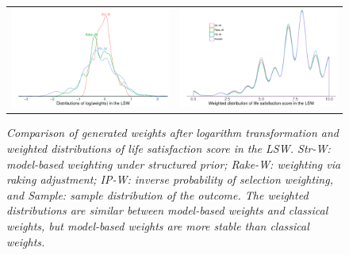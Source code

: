 \documentclass[11pt]{article}
\numberwithin{figure}{section}
\numberwithin{table}{section}
\numberwithin{equation}{section}
\begin{document}
 \begin{figure} \centering \begin{tabular}{cc}
 \includegraphics[width=.475\textwidth]{plot/weight-lsw.pdf}&\includegraphics[width=.475\textwidth]{plot/weighted-lsw-density.pdf}
 \end{tabular} \caption{\em Comparison of generated weights after logarithm
 transformation and weighted distributions of life satisfaction score in the
 LSW. Str-W: model-based weighting under structured prior; Rake-W: weighting
 via raking adjustment; IP-W: inverse probability of selection weighting, and
 Sample: sample distribution of the outcome. The weighted distributions are
 similar between model-based weights and classical weights, but model-based
 weights are more stable than classical weights.} \label{lsw-weight}
 \end{figure} 
\end{document}
